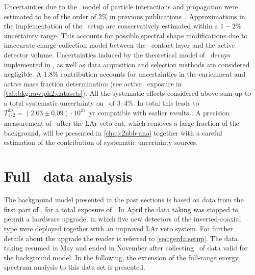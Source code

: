 Uncertainties due to the \geant\ model of particle interactions and propagation were
estimated to be of the order of 2\% in previous publications~\cite{Agostini2013a,
Agostini2015a}. Approximations in the implementation of the \gerda\ setup are
conservatively estimated within a $1-2$\% uncertainty range. This accounts for possible
spectral shape modifications due to inaccurate charge collection model between the \nplus\
contact layer and the active detector volume. Uncertainties induced by the theoretical
model of \nnbb\ decays implemented in \decayzero, as well as data acquisition and
selection methods are considered negligible. A 1.8\% contribution accounts for
uncertainties in the enrichment and active mass fraction determination (see active \gesix\
exposure in \cref{tab:bkg:raw:ph2:datasets}). All the systematic effects considered above
sum up to a total systematic uncertainty on \thalftwo\ of 3--4\%. In total this leads to
$T^{2\nu}_{1/2} = (2.03 \pm 0.09) \cdot 10^{21}$~yr compatible with earlier results
\cite{Agostini2013a, Agostini2015a}. A precision measurement of \thalftwo\ after the LAr
veto cut, which removes a large fraction of the background, will be presented in
\cref{chap:2nbb-ana} together with a careful estimation of the contribution of systematic
uncertainty sources.

\section{Full \phasetwo\ data analysis}%
\label{sec:bkg:raw:ph2p}

The background model presented in the past sections is based on data from the first part
of \phasetwo, for a total exposure of \gexpophasetwobkg. In April  the data taking was
stopped to permit a hardware upgrade, in which five new detectors of the inverted-coaxial
type were deployed together with an improved LAr veto system. For further details about
the upgrade the reader is referred to \cref{sec:gerda:setup}. The data taking resumed in
May \yr{2018} and ended in November \yr{2019} after collecting \gexpophasetwopbkg\ of data valid for
the background model. In the following, the extension of the full-range energy spectrum
analysis to this data set is presented.

